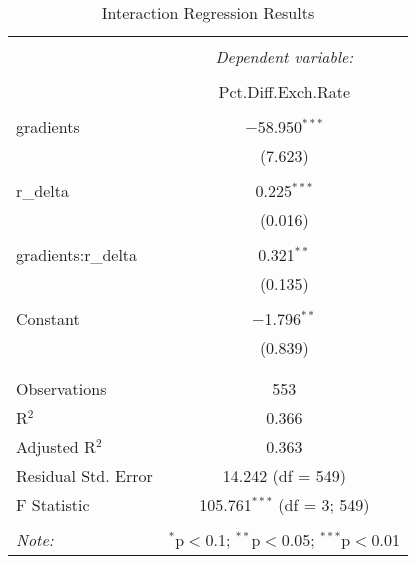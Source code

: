 
\begin{table}[!htbp] \centering 
  \caption{Interaction Regression Results} 
  \label{tab:regression} 
\begin{tabular}{@{\extracolsep{5pt}}lc} 
\\[-1.8ex]\hline 
\hline \\[-1.8ex] 
 & \multicolumn{1}{c}{\textit{Dependent variable:}} \\ 
\cline{2-2} 
\\[-1.8ex] & Pct.Diff.Exch.Rate \\ 
\hline \\[-1.8ex] 
 gradients & $-$58.950$^{***}$ \\ 
  & (7.623) \\ 
  & \\ 
 r\_delta & 0.225$^{***}$ \\ 
  & (0.016) \\ 
  & \\ 
 gradients:r\_delta & 0.321$^{**}$ \\ 
  & (0.135) \\ 
  & \\ 
 Constant & $-$1.796$^{**}$ \\ 
  & (0.839) \\ 
  & \\ 
\hline \\[-1.8ex] 
Observations & 553 \\ 
R$^{2}$ & 0.366 \\ 
Adjusted R$^{2}$ & 0.363 \\ 
Residual Std. Error & 14.242 (df = 549) \\ 
F Statistic & 105.761$^{***}$ (df = 3; 549) \\ 
\hline 
\hline \\[-1.8ex] 
\textit{Note:}  & \multicolumn{1}{r}{$^{*}$p$<$0.1; $^{**}$p$<$0.05; $^{***}$p$<$0.01} \\ 
\end{tabular} 
\end{table} 
